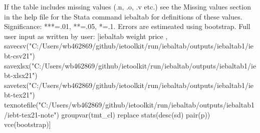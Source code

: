 If the table includes missing values (.n, .o, .v etc.) see the Missing values section in the help file for the Stata command iebaltab for definitions of these values. Significance: ***=.01, **=.05, *=.1. Errors are estimeated using bootstrap. Full user input as written by user: [iebaltab weight price , savecsv("C:/Users/wb462869/github/ietoolkit/run/iebaltab/outputs/iebaltab1/iebt-csv21") savexlsx("C:/Users/wb462869/github/ietoolkit/run/iebaltab/outputs/iebaltab1/iebt-xlsx21") savetex("C:/Users/wb462869/github/ietoolkit/run/iebaltab/outputs/iebaltab1/iebt-tex21") texnotefile("C:/Users/wb462869/github/ietoolkit/run/iebaltab/outputs/iebaltab1/iebt-tex21-note") groupvar(tmt\_cl) replace stats(desc(sd) pair(p)) vce(bootstrap)] 
